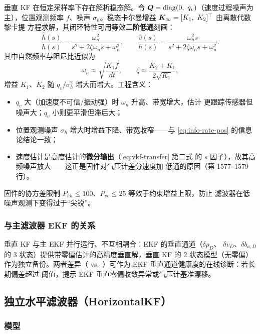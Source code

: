 垂直 KF 在恒定采样率下存在解析稳态解。令
$\m{Q} = \diag(0,\ q_v)$（速度过程噪声为主），位置观测频率 $f$、噪声
$\sigma_h$。稳态卡尔曼增益 $\boldsymbol{K}_\infty = [K_1,\ K_2]^{\top}$ 由离散代数黎卡提
方程求解，其闭环特性可用等效\textbf{二阶低通}刻画：
\begin{equation}
  \frac{\hat{h}(s)}{h(s)} = \frac{\omega_n^2}{s^2 + 2\zeta\omega_n s + \omega_n^2},
  \qquad
  \frac{\hat{v}(s)}{h(s)} = \frac{\omega_n^2 s}{s^2 + 2\zeta\omega_n s + \omega_n^2}.
  \label{eq:vkf-transfer}
\end{equation}
其中自然频率与阻尼比近似为
\begin{equation}
  \omega_n \approx \sqrt{\frac{K_1 f}{dt}},\qquad
  \zeta \approx \frac{K_2 + K_1}{2\sqrt{K_1}},
  \label{eq:vkf-bandwidth}
\end{equation}
增益 $K_1$、$K_2$ 随 $q_v/\sigma_h^2$ 增大而增大。工程含义：
\begin{itemize}
  \item $q_v$ 大（加速度不可信/振动强）时 $\omega_n$ 升高、带宽增大，估计
    更跟踪传感器但噪声大；$q_v$ 小则更平滑但滞后大；
  \item 位置观测噪声 $\sigma_h$ 增大时增益下降、带宽收窄——与
    \cref{eq:info-rate-pos} 的信息论结论一致；
  \item 速度估计是高度估计的\textbf{微分输出}（\cref{eq:vkf-transfer} 第二式
    的 $s$ 因子），故其高频噪声放大——这正是固件对气压计差分速度加
     低通的原因（第 1577--1579 行）。
\end{itemize}
固件的协方差限制 $P_{hh}\le100$、$P_{vv}\le25$ 等效于约束增益上限，防止
滤波器在低噪声观测下变得过于``尖锐''。

\subsubsection{与主滤波器 EKF 的关系}

垂直 KF 与主 EKF 并行运行、不互相耦合：EKF 的垂直通道（$\delta p_D$、
$\delta v_D$、$\delta b_{a,D}$ 的 3 状态）提供带零偏估计的高精度垂直解，垂直
KF 的 2 状态模型（无零偏）作为独立备份。两者差异（ vs.\
）可作为 EKF 垂直通道健康度的在线诊断：若长期偏差超过
阈值，提示 EKF 垂直零偏收敛异常或气压计基准漂移。

\subsection{独立水平滤波器（HorizontalKF）}

\subsubsection{模型}

